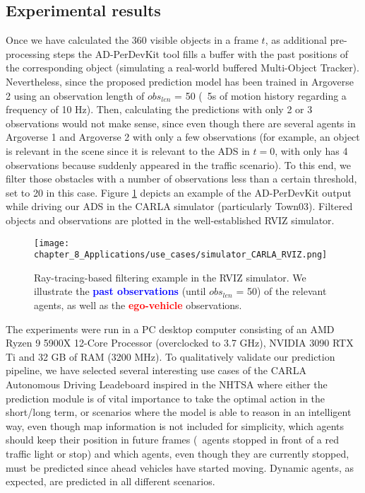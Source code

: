 \subsection{Experimental results}
\label{subsec:8_experimental_results}

Once we have calculated the 360 \degree visible objects in a frame $t$, as additional pre-processing steps the \ac{AD-PerDevKit} tool fills a buffer with the past positions of the corresponding object (simulating a real-world buffered Multi-Object Tracker). Nevertheless, since the proposed prediction model has been trained in Argoverse 2 using an observation length of \textit{$obs_{len}$} = 50 (\ie \ 5s of motion history regarding a frequency of 10 Hz). Then, calculating the predictions with only 2 or 3 observations would not make sense, since even though there are several agents in Argoverse 1 and Argoverse 2 with only a few observations (for example, an object is relevant in the scene since it is relevant to the \ac{ADS} in $t=0$, with only has 4 observations because suddenly appeared in the traffic scenario). To this end, we filter those obstacles with a number of observations less than a certain threshold, set to 20 in this case. Figure \ref{fig:chapter_8_Applications/use_cases/simulator_CARLA_RVIZ} depicts an example of the \ac{AD-PerDevKit} output while driving our \ac{ADS} in the \ac{CARLA} simulator (particularly Town03). Filtered objects and observations are plotted in the well-established RVIZ simulator. 

\begin{figure}[!h]
	\centering
	\texttt{[image: chapter\_8\_Applications/use\_cases/simulator\_CARLA\_RVIZ.png]}
	\captionsetup{justification=justified}
	\caption[Ray-tracing-based filtering example in the \ac{RVIZ} simulator]{Ray-tracing-based filtering example in the \ac{RVIZ} simulator. We illustrate the \textbf{\textcolor{blue}{past observations}} (until \textit{$obs_{len}$} = 50) of the relevant agents, as well as the \textbf{\textcolor{red}{ego-vehicle}} observations.}
	\label{fig:chapter_8_Applications/use_cases/simulator_CARLA_RVIZ}
\end{figure}

The experiments were run in a PC desktop computer consisting of an AMD Ryzen 9 5900X 12-Core Processor (overclocked to 3.7 GHz), NVIDIA 3090 RTX Ti and 32 GB of RAM (3200 MHz). To qualitatively validate our prediction pipeline, we have selected several interesting use cases of the CARLA Autonomous Driving Leadeboard inspired in the \ac{NHTSA} where either the prediction module is of vital importance to take the optimal action in the short/long term, or scenarios where the model is able to reason in an intelligent way, even though map information is not included for simplicity, which agents should keep their position in future frames (\eg \ agents stopped in front of a red traffic light or stop) and which agents, even though they are currently stopped, must be predicted since ahead vehicles have started moving. Dynamic agents, as expected, are predicted in all different scenarios. 

